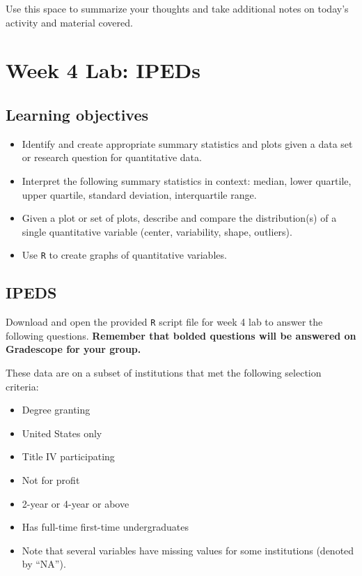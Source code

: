 \documentclass[
]{report}
\begin{document}
Use this space to summarize your thoughts and take additional notes on today's activity and material covered.

\newpage

\hypertarget{week-4-lab-ipeds}{%
\section{Week 4 Lab: IPEDs}\label{week-4-lab-ipeds}}


\hypertarget{learning-objectives-2}{%
\subsection{Learning objectives}\label{learning-objectives-2}}

\begin{itemize}
\item
  Identify and create appropriate summary statistics and plots
  given a data set or research question for quantitative data.
\item
  Interpret the following summary statistics in context:
  median, lower quartile, upper quartile,
  standard deviation, interquartile range.
\item
  Given a plot or set of plots, describe and compare the distribution(s)
  of a single quantitative variable
  (center, variability, shape, outliers).
\item
  Use \texttt{R} to create graphs of quantitative variables.
\end{itemize}

\hypertarget{ipeds}{%
\subsection{IPEDS}\label{ipeds}}

Download and open the provided \texttt{R} script file for week 4 lab to answer the following questions. \textbf{Remember that bolded questions will be answered on Gradescope for your group.}

These data are on a subset of institutions that met the following selection criteria:

\begin{itemize}
\item
  Degree granting
\item
  United States only
\item
  Title IV participating
\item
  Not for profit
\item
  2-year or 4-year or above
\item
  Has full-time first-time undergraduates
\item
  Note that several variables have missing values for some institutions (denoted by ``NA'').
\end{itemize}
\end{document}

